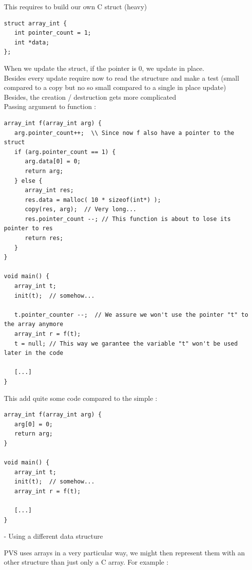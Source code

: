 \documentclass[12pt,a4paper,titlepage]{article}
\begin{document}
This requires to build our own C struct (heavy)
\begin{lstlisting}
struct array_int {
   int pointer_count = 1;
   int *data;
};
\end{lstlisting}

When we update the struct, if the pointer is 0, we update in place.\\

Besides every update require now to read the structure and make a test (small compared to a copy but no so small compared to a single in place update)\\

Besides, the creation / destruction gets more complicated\\

Passing argument to function :
\begin{lstlisting}
array_int f(array_int arg) {
   arg.pointer_count++;  \\ Since now f also have a pointer to the struct
   if (arg.pointer_count == 1) {
      arg.data[0] = 0;
      return arg;
   } else {
      array_int res;
      res.data = malloc( 10 * sizeof(int*) );
      copy(res, arg);  // Very long...
      res.pointer_count --; // This function is about to lose its pointer to res
      return res;
   }
}

void main() {
   array_int t;
   init(t);  // somehow...
   
   t.pointer_counter --;  // We assure we won't use the pointer "t" to the array anymore
   array_int r = f(t);
   t = null; // This way we garantee the variable "t" won't be used later in the code
   
   [...]   
}
\end{lstlisting}

This add quite some code compared to the simple :

\begin{lstlisting}
array_int f(array_int arg) {
   arg[0] = 0;
   return arg;
}

void main() {
   array_int t;
   init(t);  // somehow...
   array_int r = f(t);
   
   [...]   
}
\end{lstlisting}



- Using a different data structure

PVS uses arrays in a very particular way, we might then represent them with an other structure than just only a C array.
For example :
\end{document}
